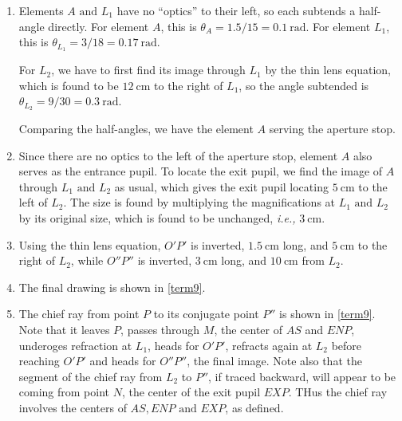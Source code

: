 \documentclass[english,a4paper,12pt]{report}
\begin{document}
{\begin{enumerate}
    \item Elements \(A \text { and }  L_1\) have no ``optics'' to their left, so each subtends a half-angle directly. For element \(A\), this is \(\theta _{A} = 1.5/15 = \SI{0.1}{\radian}  \). For element \(L_1 \), this is \(\theta _{L_1 } = 3/18 = \SI{0.17}{\radian} \). 

    For \(L_2 \), we have to first find its image through \(L_1 \) by the thin lens equation, which is found to be \(\SI{12}{\cm} \) to the right of \(L_1 \), so the angle subtended is \(\theta _{L_2}  = 9/30 = \SI{0.3}{\radian}  \).     

    Comparing the half-angles, we have the element \(A\) serving the aperture stop.

    \item Since there are no optics to the left of the aperture stop, element \(A\) also serves as the entrance pupil. To locate the exit pupil, we find the image of \(A\) through \(L_1 \text { and } L_2 \) as usual, which gives the exit pupil locating \(\SI{5}{\cm} \) to the left of \(L_2 \). The size is found by multiplying the magnifications at \(L_1 \text { and } L_2 \) by its original size, which is found to be unchanged, \textit{i.e.,} \(\SI{3}{\cm} \).
    
    \item Using the thin lens equation, \(O'P'\) is inverted, \(\SI{1.5}{\cm} \) long, and \(\SI{5}{\cm} \) to the right of \(L_2 \), while \(O''P''\) is inverted, \(\SI{3}{\cm} \) long, and \(\SI{10}{\cm} \) from \(L_2 \). 
    
    \item The final drawing is shown in \cref{term9}.
    
    \item The chief ray from point \(P\) to its conjugate point \(P''\) is shown in \cref{term9}. Note that it leaves \(P\), passes through \(M\), the center of \(AS\) and \(ENP\), underoges refraction at \(L_1 \), heads for \(O'P'\), refracts again at \(L_2 \) before reaching \(O'P'\) and heads for \(O''P''\), the final image. Note also that the segment of the chief ray from \(L_2 \) to \(P''\), if traced backward, will appear to be coming from point \(N\), the center of the exit pupil \(EXP\). THus the chief ray involves the centers of \(AS, ENP \text { and } EXP\), as defined.          
    
\end{enumerate}
~
} 
\end{document}
